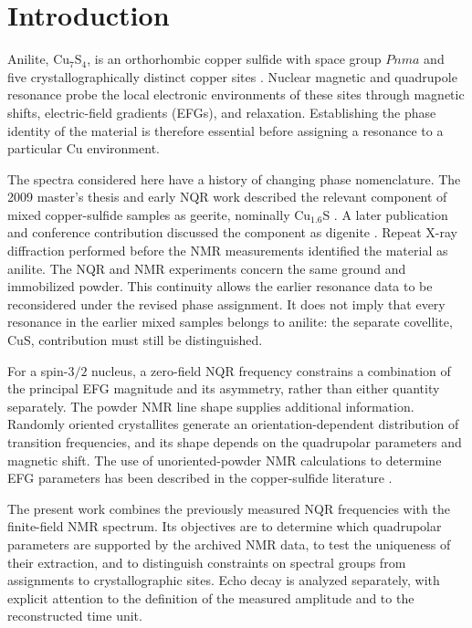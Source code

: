 \documentclass[10pt,a4paper,twocolumn]{article}
\begin{document}
\section{Introduction}

Anilite, Cu$_7$S$_4$, is an orthorhombic copper sulfide with space group $Pnma$ and five crystallographically distinct copper sites \citep{Morimoto1969,Koto1970}. Nuclear magnetic and quadrupole resonance probe the local electronic environments of these sites through magnetic shifts, electric-field gradients (EFGs), and relaxation. Establishing the phase identity of the material is therefore essential before assigning a resonance to a particular Cu environment.

The spectra considered here have a history of changing phase nomenclature. The 2009 master's thesis and early NQR work described the relevant component of mixed copper-sulfide samples as geerite, nominally Cu$_{1.6}$S \citep{Evlampiev2009,Gainov2009}. A later publication and conference contribution discussed the component as digenite \citep{Gainov2013,Gainov2014}. Repeat X-ray diffraction performed before the NMR measurements identified the material as anilite. The NQR and NMR experiments concern the same ground and immobilized powder. This continuity allows the earlier resonance data to be reconsidered under the revised phase assignment. It does not imply that every resonance in the earlier mixed samples belongs to anilite: the separate covellite, CuS, contribution must still be distinguished.

For a spin-$3/2$ nucleus, a zero-field NQR frequency constrains a combination of the principal EFG magnitude and its asymmetry, rather than either quantity separately. The powder NMR line shape supplies additional information. Randomly oriented crystallites generate an orientation-dependent distribution of transition frequencies, and its shape depends on the quadrupolar parameters and magnetic shift. The use of unoriented-powder NMR calculations to determine EFG parameters has been described in the copper-sulfide literature \citep{Gainov2009}.

The present work combines the previously measured NQR frequencies with the finite-field NMR spectrum. Its objectives are to determine which quadrupolar parameters are supported by the archived NMR data, to test the uniqueness of their extraction, and to distinguish constraints on spectral groups from assignments to crystallographic sites. Echo decay is analyzed separately, with explicit attention to the definition of the measured amplitude and to the reconstructed time unit.
\end{document}
